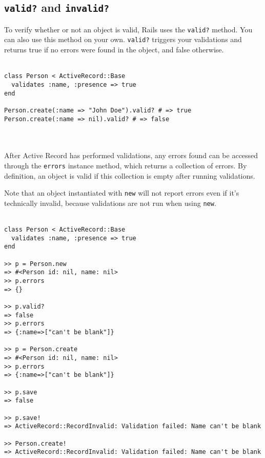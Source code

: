 \documentclass[10pt]{book}
\begin{document}
\subsection{ \texttt{valid?} and \texttt{invalid?}}

To verify whether or not an object is valid, Rails uses the \texttt{valid?} method. You can also use this method on your own. \texttt{valid?} triggers your validations and returns true if no errors were found in the object, and false otherwise.
\\ \\
\begin{minipage}{\textwidth}{\scriptsize
\begin{verbatim}
class Person < ActiveRecord::Base
  validates :name, :presence => true
end
 
Person.create(:name => "John Doe").valid? # => true
Person.create(:name => nil).valid? # => false
\end{verbatim}}
\end{minipage}
\\ \\

After Active Record has performed validations, any errors found can be accessed through the \texttt{errors}  instance method, which returns a collection of errors. By definition,  an object is valid if this collection is empty after running  validations.

Note that an object instantiated with \texttt{new} will not report errors even if it’s technically invalid, because validations are not run when using \texttt{new}.
\\ \\
\begin{minipage}{\textwidth}{\scriptsize
\begin{verbatim}
class Person < ActiveRecord::Base
  validates :name, :presence => true
end
 
>> p = Person.new
=> #<Person id: nil, name: nil>
>> p.errors
=> {}
 
>> p.valid?
=> false
>> p.errors
=> {:name=>["can't be blank"]}
 
>> p = Person.create
=> #<Person id: nil, name: nil>
>> p.errors
=> {:name=>["can't be blank"]}
 
>> p.save
=> false
 
>> p.save!
=> ActiveRecord::RecordInvalid: Validation failed: Name can't be blank
 
>> Person.create!
=> ActiveRecord::RecordInvalid: Validation failed: Name can't be blank
\end{verbatim}}
\end{minipage}
\\ \\
\end{document}
